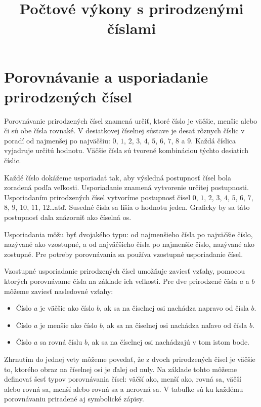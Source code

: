 \documentclass{article}
\title{Počtové výkony s prirodzenými číslami}
\begin{document}
\maketitle

\section{Porovnávanie a usporiadanie prirodzených čísel}

Porovnávanie prirodzených čísel znamená určiť, ktoré číslo je väčšie, menšie alebo či sú obe čísla rovnaké. V desiatkovej číselnej sústave je desať rôznych číslic v poradí od najmenšej po najväčšiu: \(0\), \(1\), \(2\), \(3\), \(4\), \(5\), \(6\), \(7\), \(8\) a \(9\). Každá číslica vyjadruje určitú hodnotu. Väčšie čísla sú tvorené kombináciou týchto desiatich číslic.

Každé číslo dokážeme usporiadať tak, aby výsledná postupnosť čísel bola zoradená podľa veľkosti. Usporiadanie znamená vytvorenie určitej postupnosti. Usporiadaním prirodzených čísel vytvoríme postupnosť čísel \(0\), \(1\), \(2\), \(3\), \(4\), \(5\), \(6\), \(7\), \(8\), \(9\), \(10\), \(11\), \(12\)\dots atď. Susedné čísla sa líšia o hodnotu jeden. Graficky by sa táto postupnosť dala znázorniť ako číselná os.

\begin{center}
\end{center}

Usporiadania môžu byť dvojakého typu: od najmenšieho čísla po najväčšie číslo, nazývané ako vzostupné, a od najväčšieho čísla po najmenšie číslo, nazývané ako zostupné. Pre potreby porovnávania sa používa vzostupné usporiadanie čísel.

Vzostupné usporiadanie prirodzených čísel umožňuje zaviesť vzťahy, pomocou ktorých porovnávame čísla na základe ich veľkosti. Pre dve prirodzené čísla \(a\) a \(b\) môžeme zaviesť nasledovné vzťahy:
\begin{itemize}
  \item Číslo \(a\) je väčšie ako číslo \(b\), ak sa na číselnej osi nachádza napravo od čísla \(b\).
  \item Číslo \(a\) je menšie ako číslo \(b\), ak sa na číselnej osi nachádza naľavo od čísla \(b\).
  \item Číslo \(a\) sa rovná číslu \(b\), ak sa na číselnej osi nachádzajú v tom istom bode.
\end{itemize}
Zhrnutím do jednej vety môžeme povedať, že z dvoch prirodzených čísel je väčšie to, ktorého obraz na číselnej osi je ďalej od nuly. Na základe tohto môžeme definovať šesť typov porovnávania čísel: väčší ako, menší ako, rovná sa, väčší alebo rovná sa, menší alebo rovná sa a nerovná sa. V tabuľke sú ku každému porovnávaniu priradené aj symbolické zápisy.
\end{document}
